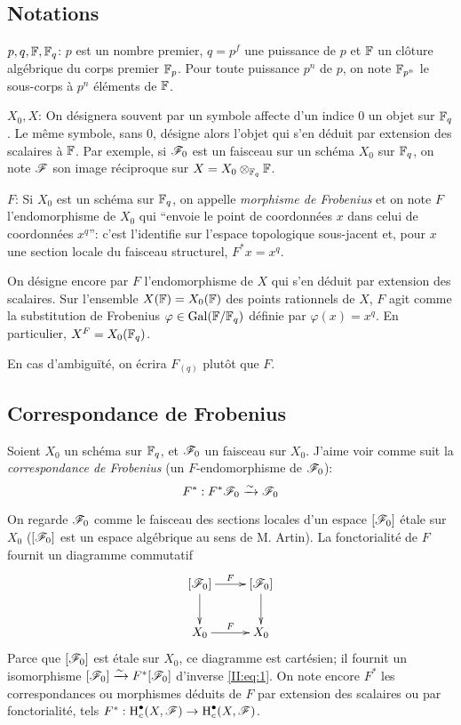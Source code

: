 \documentclass[oneside]{book}
\begin{document}
\subsection{Notations}\label{II:1-1}

$p,q,\mathbb{F},\mathbb{F}_q$: $p$ est un nombre premier, $q=p^f$ une puissance de $p$ et 
$\mathbb{F}$ un clôture algébrique du corps premier $\mathbb{F}_p$. Pour toute puissance 
$p^n$ de $p$, on note $\mathbb{F}_{p^n}$ le sous-corps à $p^n$ éléments de $\mathbb{F}$. 

$X_0,X$: On désignera souvent par un symbole affecte d'un indice $0$ un objet 
sur $\mathbb{F}_q$. Le même symbole, sans $0$, désigne alors l'objet qui s'en déduit 
par extension des scalaires à $\mathbb{F}$. Par exemple, si $\mathscr{F}_0$ est un faisceau 
sur un schéma $X_0$ sur $\mathbb{F}_q$, on note $\mathscr{F}$ son image réciproque sur 
$X=X_0\otimes_{\mathbb{F}_q} \mathbb{F}$. 

$F$: Si $X_0$ est un schéma sur $\mathbb{F}_q$, on appelle \emph{morphisme de 
Frobenius} et on note $F$ l'endomorphisme de $X_0$ qui ``envoie le point de 
coordonnées $x$ dans celui de coordonnées $x^q$'': c'est l'identifie sur 
l'espace topologique sous-jacent et, pour $x$ une section locale du faisceau 
structurel, $F^* x = x^q$. 

On désigne encore par $F$ l'endomorphisme de $X$ qui s'en déduit par 
extension des scalaires. Sur l'ensemble $X(\mathbb{F}) = X_0(\mathbb{F})$ des points 
rationnels de $X$, $F$ agit comme la substitution de Frobenius 
$\varphi\in\operatorname{Gal}(\mathbb{F}/\mathbb{F}_q)$ définie par $\varphi(x)=x^q$. En particulier, 
$X^F=X_0(\mathbb{F}_q)$. 

En cas d'ambiguïté, on écrira $F_{(q)}$ plutôt que $F$. 










\subsection{Correspondance de Frobenius}\label{II:1-2}

Soient $X_0$ un schéma sur $\mathbb{F}_q$, et $\mathscr{F}_0$ un faisceau sur $X_0$. J'aime 
voir comme suit la \emph{correspondance de Frobenius} (un $F$-endomorphisme de 
$\mathscr{F}_0$): 
\begin{equation}\label{II:eq:1}
  F^* : F^*\mathscr{F}_0 \xrightarrow\sim \mathscr{F}_0
\end{equation}

On regarde $\mathscr{F}_0$ comme le faisceau des sections locales d'un espace 
$[\mathscr{F}_0]$ étale sur $X_0$ ($[\mathscr{F}_0]$ est un espace algébrique au sens de M. 
Artin). La fonctorialité de $F$ fournit un diagramme commutatif 
\[\xymatrix{
  [\cF_0] \ar[r]^-F \ar[d]
    & [\cF_0] \ar[d] \\
  X_0 \ar[r]^F 
    & X_0
}\]
Parce que $[\mathscr{F}_0]$ est étale sur $X_0$, ce diagramme est cartésien; il fournit 
un isomorphisme $[\mathscr{F}_0]\xrightarrow\sim F^*[\mathscr{F}_0]$ d'inverse \eqref{II:eq:1}. On note 
encore $F^*$ les correspondances ou morphismes déduits de $F$ par extension 
des scalaires ou par fonctorialité, tels 
$F^*:\operatorname{H}_c^\bullet(X,\mathscr{F})\to \operatorname{H}_c^\bullet(X,\mathscr{F})$. 
\end{document}
